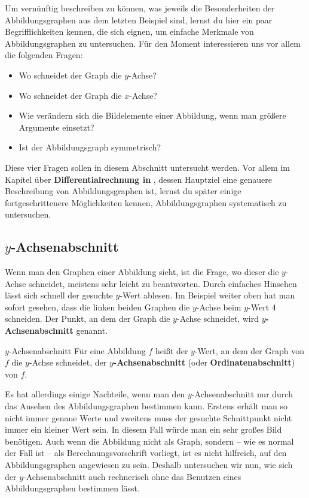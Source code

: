 \documentclass[../../main.tex]{subfiles}
\begin{document}
Um vernünftig beschreiben zu können, was jeweils die Besonderheiten der Abbildungsgraphen aus dem letzten Beispiel sind, lernst du hier ein paar Begrifflichkeiten kennen, die sich eignen, um einfache Merkmale von Abbildungsgraphen zu untersuchen. Für den Moment interessieren uns vor allem die folgenden Fragen:
\begin{itemize}[noitemsep]
    \item Wo schneidet der Graph die $y$-Achse?
    \item Wo schneidet der Graph die $x$-Achse?
    \item Wie verändern sich die Bildelemente einer Abbildung, wenn man größere Argumente einsetzt?
    \item Ist der Abbildungsgraph symmetrisch?
\end{itemize}

Diese vier Fragen sollen in diesem Abschnitt untersucht werden. Vor allem im Kapitel über \textbf{Differentialrechnung in \Real}, dessen Hauptziel eine genauere Beschreibung von Abbildungsgraphen ist, lernst du später einige fortgeschrittenere Möglichkeiten kennen, Abbildungsgraphen systematisch zu untersuchen.

\subsection{$y$-Achsenabschnitt}
\label{sec:abbildungen_ordinatenabschnitt}

Wenn man den Graphen einer Abbildung sieht, ist die Frage, wo dieser die $y$-Achse schneidet, meistens sehr leicht zu beantworten. Durch einfaches Hinsehen lässt sich schnell der gesuchte $y$-Wert ablesen. Im Beispiel weiter oben hat man sofort gesehen, dass die linken beiden Graphen die $y$-Achse beim $y$-Wert $4$ schneiden. Der Punkt, an dem der Graph die $y$-Achse schneidet, wird \textbf{$y$-Achsenabschnitt} genannt.

\begin{definition}{$y$-Achsenabschnitt}
    Für eine Abbildung $f$ heißt der $y$-Wert, an dem der Graph von $f$ die $y$-Achse schneidet, der \textbf{$y$-Achsenabschnitt} (oder \textbf{Ordinatenabschnitt}) von $f$.
\end{definition}

Es hat allerdings einige Nachteile, wenn man den $y$-Achsenabschnitt nur durch das Ansehen des Abbildungsgraphen bestimmen kann. Erstens erhält man so nicht immer genaue Werte und zweitens muss der gesuchte Schnittpunkt nicht immer ein kleiner Wert sein. In diesem Fall würde man ein sehr großes Bild benötigen. Auch wenn die Abbildung nicht als Graph, sondern -- wie es normal der Fall ist -- als Berechnungsvorschrift vorliegt, ist es nicht hilfreich, auf den Abbildungsgraphen angewiesen zu sein. Deshalb untersuchen wir nun, wie sich der $y$-Achsenabschnitt auch rechnerisch ohne das Benutzen eines Abbildungsgraphen bestimmen lässt.
\end{document}
